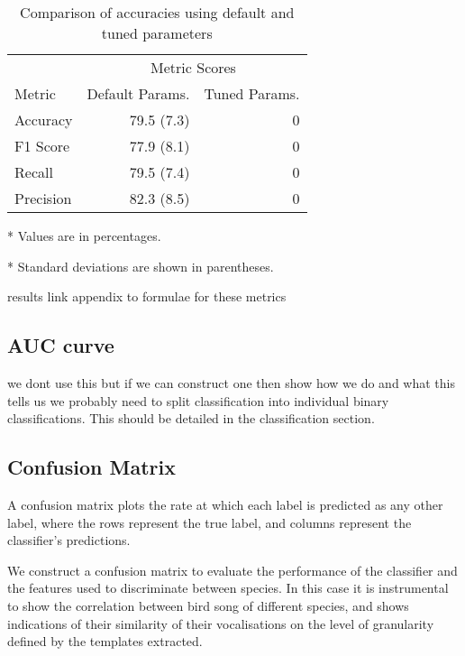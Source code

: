 \begin{table}
  \centering
  \caption{Comparison of accuracies using default and tuned parameters}
  \label{tbl:acc_before_after}
  \begin{threeparttable}
    \begin{tabular}{l r r}
      & \multicolumn{2}{c}{Metric Scores} \\
      Metric    & Default Params. & Tuned Params. \\ \hline
      Accuracy  & 79.5 (7.3) & 0 \\
      F1 Score  & 77.9 (8.1) & 0 \\
      Recall    & 79.5 (7.4) & 0 \\
      Precision & 82.3 (8.5) & 0
    \end{tabular}
    \begin{tablenotes}
      \footnotesize
      \item[*] Values are in percentages.
      \item[*] Standard deviations are shown in parentheses.
    \end{tablenotes}
  \end{threeparttable}
\end{table}

results
link appendix to formulae for these metrics

\subsection{AUC curve}
we dont use this but if we can construct one then show how we do and what
this tells us
we probably need to split classification into individual binary classifications.
This should be detailed in the classification section.

\subsection{Confusion Matrix}
A confusion matrix plots the rate at which each label is predicted as any other
label, where the rows represent the true label, and columns represent the
classifier's predictions.

We construct a confusion matrix to evaluate the performance of the classifier
and the features used to discriminate between species.
In this case it is instrumental to show the correlation between bird song of
different species, and shows indications of their similarity of their
vocalisations on the level of granularity defined by the templates extracted.

